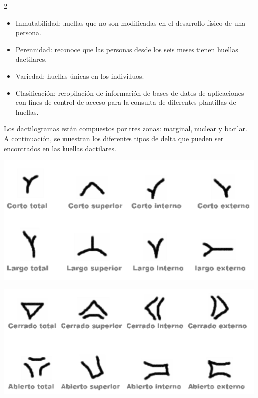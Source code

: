 \documentclass[12pt,spanish,Letterpaper,openany]{book}
\providecommand{\tightlist}{%
  \setlength{\itemsep}{0pt}\setlength{\parskip}{0pt}}
\begin{document}
\begin {multicols}{2}
\begin{itemize}
\tightlist
\item
  Inmutabilidad: huellas que no son modificadas en el desarrollo físico de una
  persona.
\item
  Perennidad: reconoce que las personas desde los seis meses tienen huellas
  dactilares.
\item
  Variedad: huellas únicas en los individuos.
\item
  Clasificación: recopilación de información de bases de datos de aplicaciones
  con fines de control de acceso para la consulta de diferentes plantillas de
  huellas.
\end{itemize}

Los dactilogramas están compuestos por tres zonas: marginal, nuclear y bacilar. A continuación, se muestran los diferentes tipos de delta que pueden ser encontrados en las huellas dactilares.

\begin {flushleft}
\noindent\begin{minipage}[c]{\columnwidth}

\centering

\includegraphics[width=1\linewidth]{images/06_02}

\end{minipage}

\end {flushleft}

\begin {flushleft}
\noindent\begin{minipage}[c]{\columnwidth}

\centering

\includegraphics[width=1\linewidth]{images/06_03}


\end{minipage}
\end{flushleft}
\end{multicols}
\end{document}
